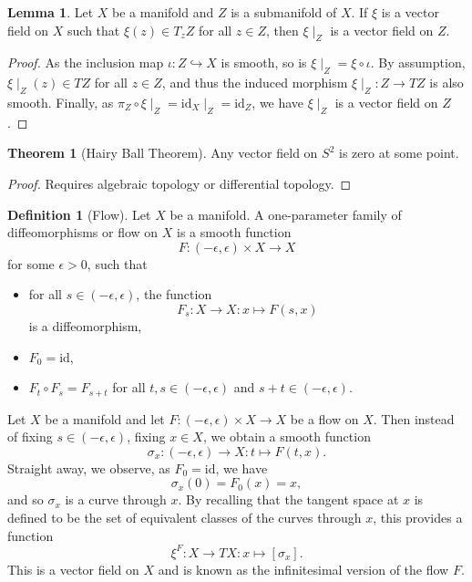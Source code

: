 \documentclass[]{article}
\theoremstyle{definition}
\newtheorem{theorem}{Theorem}
\theoremstyle{definition}
\newtheorem{definition}{Definition}[section]
\newtheorem{lemma}{Lemma}[section]
\begin{document}
\begin{lemma}
  Let \(X\) be a manifold and \(Z\) is a submanifold of \(X\). If \(\xi\) is a 
  vector field on \(X\) such that \(\xi(z) \in T_z Z\) for all \(z \in Z\), then 
  \(\xi\mid_Z\) is a vector field on \(Z\).
\end{lemma}
\begin{proof}
  As the inclusion map \(\iota : Z \hookrightarrow X\) is smooth, so is 
  \(\xi\mid_Z = \xi \circ \iota\). By assumption, \(\xi\mid_Z(z) \in TZ\) for 
  all \(z \in Z\), and thus the induced morphism \(\xi\mid_Z : Z \to TZ\) 
  is also smooth. Finally, as \(\pi_Z \circ \xi\mid_Z = \text{id}_X\mid_Z 
  = \text{id}_Z\), we have \(\xi\mid_Z\) is a vector field on \(Z\).
\end{proof}

\begin{theorem}[Hairy Ball Theorem]
  Any vector field on \(S^2\) is zero at some point.
\end{theorem}
\begin{proof}
  Requires algebraic topology or differential topology.
\end{proof}

\begin{definition}[Flow]
  Let \(X\) be a manifold. A one-parameter family of diffeomorphisms or 
  flow on \(X\) is a smooth function 
  \[F : (-\epsilon, \epsilon) \times X \to X\]
  for some \(\epsilon > 0\), such that 
  \begin{itemize}
    \item for all \(s \in (-\epsilon, \epsilon)\), the function 
      \[F_s : X \to X : x \mapsto F(s, x)\]
      is a diffeomorphism,
    \item \(F_0 = \text{id}\),
    \item \(F_t \circ F_s = F_{s + t}\) for all \(t, s \in (-\epsilon, \epsilon)\) 
      and \(s + t \in (-\epsilon, \epsilon)\).
  \end{itemize}
\end{definition}

Let \(X\) be a manifold and let \(F : (-\epsilon, \epsilon) \times X \to X\) 
be a flow on \(X\). Then instead of fixing \(s \in (-\epsilon, \epsilon)\), 
fixing \(x \in X\), we obtain a smooth function 
\[\sigma_x : (-\epsilon, \epsilon) \to X : t \mapsto F(t, x).\]
Straight away, we observe, as \(F_0 = \text{id}\), we have 
\[\sigma_x(0) = F_0(x) = x,\]
and so \(\sigma_x\) is a curve through \(x\). By recalling that the tangent 
space at \(x\) is defined to be the set of equivalent classes of the curves 
through \(x\), this provides a function 
\[\xi^F : X \to TX : x \mapsto [\sigma_x].\]
This is a vector field on \(X\) and is known as the infinitesimal version of 
the flow \(F\).
\end{document}
